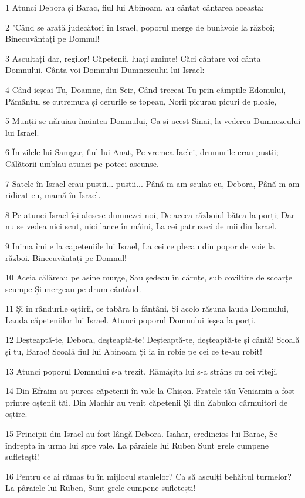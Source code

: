 \par 1 Atunci Debora și Barac, fiul lui Abinoam, au cântat cântarea aceasta:
\par 2 "Când se arată judecători în Israel, poporul merge de bunăvoie la război; Binecuvântați pe Domnul!
\par 3 Ascultați dar, regilor! Căpetenii, luați aminte! Căci cântare voi cânta Domnului. Cânta-voi Domnului Dumnezeului lui Israel:
\par 4 Când ieșeai Tu, Doamne, din Seir, Când treceai Tu prin câmpiile Edomului, Pământul se cutremura și cerurile se topeau, Norii picurau picuri de ploaie,
\par 5 Munții se năruiau înaintea Domnului, Ca și acest Sinai, la vederea Dumnezeului lui Israel.
\par 6 În zilele lui Șamgar, fiul lui Anat, Pe vremea Iaelei, drumurile erau pustii; Călătorii umblau atunci pe poteci ascunse.
\par 7 Satele în Israel erau pustii... pustii... Până m-am sculat eu, Debora, Până m-am ridicat eu, mamă în Israel.
\par 8 Pe atunci Israel își alesese dumnezei noi, De aceea războiul bătea la porți; Dar nu se vedea nici scut, nici lance în mâini, La cei patruzeci de mii din Israel.
\par 9 Inima îmi e la căpeteniile lui Israel, La cei ce plecau din popor de voie la război. Binecuvântați pe Domnul!
\par 10 Aceia călăreau pe asine murge, Sau ședeau în căruțe, sub coviltire de scoarțe scumpe Și mergeau pe drum cântând.
\par 11 Și în rândurile oștirii, ce tabăra la fântâni, Și acolo răsuna lauda Domnului, Lauda căpeteniilor lui Israel. Atunci poporul Domnului ieșea la porți.
\par 12 Deșteaptă-te, Debora, deșteaptă-te! Deșteaptă-te, deșteaptă-te și cântă! Scoală și tu, Barac! Scoală fiul lui Abinoam Și ia în robie pe cei ce te-au robit!
\par 13 Atunci poporul Domnului s-a trezit. Rămășița lui s-a strâns cu cei viteji.
\par 14 Din Efraim au purces căpetenii în vale la Chișon. Fratele tău Veniamin a fost printre oștenii tăi. Din Machir au venit căpetenii Și din Zabulon cârmuitori de oștire.
\par 15 Principii din Israel au fost lângă Debora. Isahar, credincios lui Barac, Se îndrepta în urma lui spre vale. La pâraiele lui Ruben Sunt grele cumpene sufletești!
\par 16 Pentru ce ai rămas tu în mijlocul staulelor? Ca să asculți behăitul turmelor? La pâraiele lui Ruben, Sunt grele cumpene sufletești!
